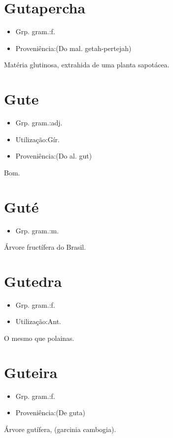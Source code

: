 \section{Gutapercha}
\begin{itemize}
\item {Grp. gram.:f.}
\end{itemize}
\begin{itemize}
\item {Proveniência:(Do mal. \textunderscore getah-pertejah\textunderscore )}
\end{itemize}
Matéria glutinosa, extrahida de uma planta sapotácea.
\section{Gute}
\begin{itemize}
\item {Grp. gram.:adj.}
\end{itemize}
\begin{itemize}
\item {Utilização:Gír.}
\end{itemize}
\begin{itemize}
\item {Proveniência:(Do al. \textunderscore gut\textunderscore )}
\end{itemize}
Bom.
\section{Guté}
\begin{itemize}
\item {Grp. gram.:m.}
\end{itemize}
Árvore fructífera do Brasil.
\section{Gutedra}
\begin{itemize}
\item {Grp. gram.:f.}
\end{itemize}
\begin{itemize}
\item {Utilização:Ant.}
\end{itemize}
O mesmo que \textunderscore polainas\textunderscore .
\section{Guteira}
\begin{itemize}
\item {Grp. gram.:f.}
\end{itemize}
\begin{itemize}
\item {Proveniência:(De \textunderscore guta\textunderscore )}
\end{itemize}
Árvore gutífera, (\textunderscore garcinia cambogia\textunderscore ).

